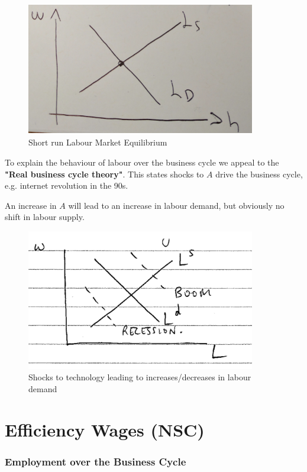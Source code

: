 \documentclass[11pt]{article}
\begin{document}
\begin{figure}[h]
    \centering
    \includegraphics[width=10cm]{photos/short run labour market equilibrium.png}
    \caption{Short run Labour Market Equilibrium}
    \label{fig:labour market equilibrium}
\end{figure}

To explain the behaviour of labour over the business cycle we appeal to the \textbf{"Real business cycle theory"}. This states shocks to $A$ drive the business cycle, e.g. internet revolution in the 90s.

An increase in $A$ will lead to an increase in labour demand, but obviously no shift in labour supply.

\begin{figure}[h]
    \centering
    \includegraphics[width=10cm]{photos/labour market shocks to A.png}
    \caption{Shocks to technology leading to increases/decreases in labour demand}
    \label{fig:labour market shocks}
\end{figure}


\newpage

\section{Efficiency Wages (NSC)}

\subsubsection{Employment over the Business Cycle}
\end{document}
